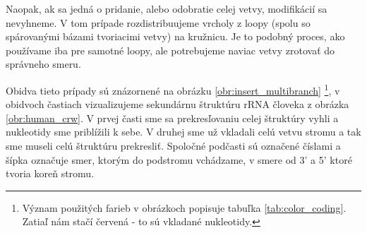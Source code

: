 Naopak, ak sa jedná o pridanie, alebo odobratie celej vetvy, modifikácií sa nevyhneme.
V tom prípade rozdistribuujeme vrcholy z loopy (spolu so spárovanými bázami tvoriacimi
vetvy) na kružnicu. Je to podobný proces, ako používame iba pre samotné loopy,
ale potrebujeme naviac vetvy zrotovať do správneho smeru.

Obidva tieto prípady sú znázornené na obrázku \ref{obr:insert_multibranch}
\footnote{Význam použitých farieb v obrázkoch popisuje tabuľka \ref{tab:color_coding}.
  Zatiaľ nám stačí červená - to sú vkladané nukleotidy.},
v obidvoch častiach vizualizujeme sekundárnu štruktúru rRNA človeka z obrázka \ref{obr:human_crw}.
V prvej časti sme sa prekresľovaniu celej štruktúry vyhli a nukleotidy sme
priblížili k sebe. V druhej sme už vkladali celú vetvu stromu a tak sme museli
celú štruktúru prekresliť. Spoločné podčasti sú označené číslami a šípka označuje
smer, ktorým do podstromu vchádzame, v smere od 3' a 5' ktoré tvoria koreň stromu.

